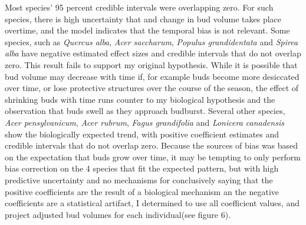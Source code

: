 \documentclass{article}\usepackage[]{graphicx}\usepackage[]{color}
\begin{document}
\par Most species' 95 percent credible intervals were overlapping zero. For such species, there is high uncertainty that and change in bud volume takes place overtime, and the model indicates that the temporal bias is not relevant. Some species, such as \textit{Quercus alba}, \textit{Acer saccharum}, \textit{Populus grandidentata} and \textit{Spirea alba} have negative estimated effect sizes and credible intervals that do not overlap zero. This result fails to support my original hypothesis. While it is possible that bud volume may decrease with time if, for example buds become more desiccated over time, or lose protective structures over the course of the season, the effect of shrinking buds with time runs counter to my biological hypothesis and the observation that buds swell as they approach budburst. Several other species, \textit{Acer pensylvanicum}, \textit{Acer rubrum}, \textit{Fagus grandifolia} and \textit{Lonicera canadensis} show the biologically expected trend, with positive coefficient estimates and credible intervals that do not overlap zero. Because the sources of bias was based on the expectation that buds grow over time, it may be tempting to only perform bias correction on the 4 species that fit the expected pattern, but with high predictive uncertainty and no mechanisms for conclusively saying that the positive coefficients are the result of a biological mechanism an the negative coefficients are a statistical artifact, I determined to use all coefficient values, and project adjusted bud volumes for each individual(see figure 6).
\end{document}
